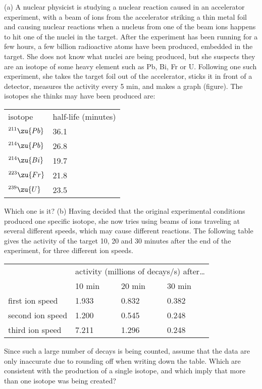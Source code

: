 (a) A nuclear physicist is studying a nuclear reaction
caused in an accelerator experiment, with a beam of ions
from the accelerator striking a thin metal foil and causing
nuclear reactions when a nucleus from one of the beam ions
happens to hit one of the nuclei in the target.  After the
experiment has been running for a few hours, a few billion
radioactive atoms have been produced, embedded in the
target.  She does not know what nuclei are being produced,
but she suspects they are an isotope of some heavy element
such as Pb, Bi, Fr or U. Following one such experiment,
she takes the target foil out of the accelerator, sticks it
in front of a detector, measures the activity every 5 min,
and makes a graph (figure).  The isotopes she thinks may
have been produced are:

\begin{tabular}{ll}
isotope         & half-life (minutes)\\
$^{211}\zu{Pb}$ & 36.1\\
$^{214}\zu{Pb}$ & 26.8\\
$^{214}\zu{Bi}$ & 19.7\\
$^{223}\zu{Fr}$ & 21.8\\
$^{239}\zu{U}$ & 23.5\\
\end{tabular}

\noindent Which one is it?\hwendpart
(b) Having decided that the original experimental conditions
produced one specific isotope, she now tries using beams of
ions traveling at several different speeds, which may cause
different reactions.  The following table gives the activity
of the target 10, 20 and 30 minutes after the end of the
experiment, for three different ion speeds.

\begin{tabular}{llll}
& \multicolumn{3}{l}{activity (millions of decays/s) after\ldots}\\
&        10 min        & 20 min & 30 min\\
first ion speed                & 1.933        & 0.832        & 0.382 \\
second ion speed        & 1.200        & 0.545        & 0.248\\
third ion speed                & 7.211        & 1.296        & 0.248
\end{tabular}

\noindent Since such a large number of decays is being counted, assume
that the data are only inaccurate due to rounding off when
writing down the table.  Which are consistent with the
production of a single isotope, and which imply that more
than one isotope was being created?
